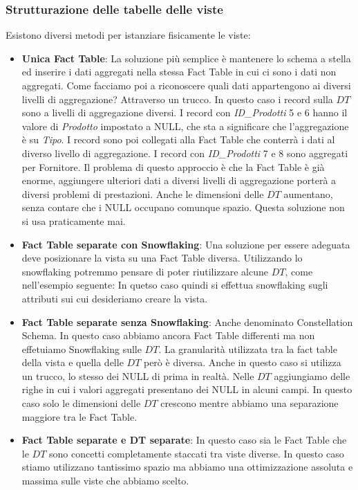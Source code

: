 \subsubsection{Strutturazione delle tabelle delle viste}
Esistono diversi metodi per istanziare fisicamente le viste:
\begin{itemize}
	\item \textbf{Unica Fact Table}: La soluzione più semplice è mantenere lo schema a stella ed inserire i dati aggregati nella stessa Fact Table in cui ci sono i dati non aggregati. Come facciamo poi a riconoscere quali dati appartengono ai diversi livelli di aggregazione? Attraverso un trucco.
	\noindent In questo caso i record sulla $DT$ sono a livelli di aggregazione diversi. I record con \textit{ID\_Prodotti} 5 e 6 hanno il valore di \textit{Prodotto} impostato a NULL, che sta a significare che l'aggregazione è su \textit{Tipo}.
	I record sono poi collegati alla Fact Table che conterrà i dati al diverso livello di aggregazione. I record con \textit{ID\_Prodotti} 7 e 8 sono aggregati per Fornitore.
	Il problema di questo approccio è che la Fact Table è già enorme, aggiungere ulteriori dati a diversi livelli di aggregazione porterà a diversi problemi di prestazioni. Anche le dimensioni delle $DT$ aumentano, senza contare che i NULL occupano comunque spazio. Questa soluzione non si usa praticamente mai.\newline
	\item \textbf{Fact Table separate con Snowflaking}: Una soluzione per essere adeguata deve posizionare la vista su una Fact Table diversa. Utilizzando lo snowflaking potremmo pensare di poter riutilizzare alcune $DT$, come nell'esempio seguente:
	\noindent In quetso caso quindi si effettua snowflaking sugli attributi sui cui desideriamo creare la vista.
	\item \textbf{Fact Table separate senza Snowflaking}: Anche denominato Constellation Schema. In questo caso abbiamo ancora Fact Table differenti ma non effetuiamo Snowflaking sulle $DT$.\newline
	La granularità utilizzata tra la fact table della vista e quella delle $DT$ però è diversa. Anche in questo caso si utilizza un trucco, lo stesso dei NULL di prima in realtà. Nelle $DT$ aggiungiamo delle righe in cui i valori aggregati presentano dei NULL in alcuni campi. In questo caso solo le dimensioni delle $DT$ crescono mentre abbiamo una separazione maggiore tra le Fact Table.
	\item \textbf{Fact Table separate e DT separate}: In questo caso sia le Fact Table che le $DT$ sono concetti completamente staccati tra viste diverse. In questo caso stiamo utilizzano tantissimo spazio ma abbiamo una ottimizzazione assoluta e massima sulle viste che abbiamo scelto.
\end{itemize}

